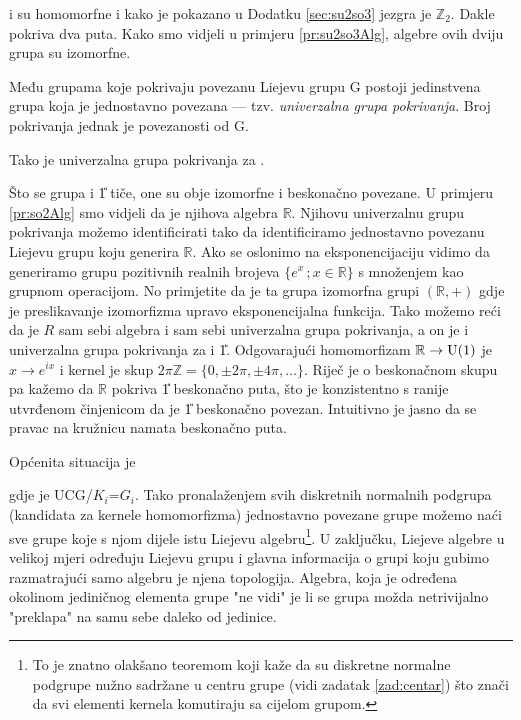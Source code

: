 \begin{primjer}[\SO{3} i \SU{2}]
 i  su homomorfne i kako je pokazano u Dodatku \ref{sec:su2so3} 
jezgra je $\mathbb{Z}_2$. Dakle  pokriva  dva puta.
Kako smo vidjeli u primjeru \ref{pr:su2so3Alg}, algebre ovih
dviju grupa su izomorfne.
\end{primjer}

\begin{teorem}
Među grupama koje pokrivaju povezanu Liejevu grupu G postoji jedinstvena
grupa koja je jednostavno povezana --- tzv. \emph{univerzalna grupa pokrivanja}.
Broj pokrivanja jednak je povezanosti od G. 
\end{teorem}


Tako je  univerzalna grupa pokrivanja za .

\centerline{}

Što se grupa  i \U{1} tiče, one su obje izomorfne i beskonačno
povezane. U primjeru \ref{pr:so2Alg} smo vidjeli da je njihova
algebra $\mathbb{R}$.
Njihovu univerzalnu grupu pokrivanja možemo identificirati
tako da identificiramo jednostavno povezanu Liejevu grupu koju
generira $\mathbb{R}$. Ako se oslonimo na eksponencijaciju
vidimo da generiramo grupu pozitivnih realnih brojeva
$\{e^{x}\,; x \in \mathbb{R}\}$ s množenjem kao grupnom operacijom.
No primjetite da je ta grupa izomorfna grupi $(\mathbb{R}, +)$
gdje je preslikavanje izomorfizma upravo eksponencijalna funkcija.
Tako možemo reći da je $R$ sam sebi algebra i sam sebi univerzalna
grupa pokrivanja, a on je i univerzalna grupa pokrivanja za
 i \U{1}. Odgovarajući homomorfizam $\mathbb{R} \to \mathrm{U}(1)$
je $x \to e^{ix}$ i kernel je skup $2\pi\mathbb{Z} = \{0, \pm 2\pi,
\pm 4\pi, \ldots\}$. Riječ je o beskonačnom skupu pa kažemo da
$\mathbb{R}$ pokriva \U{1} beskonačno puta, što je konzistentno
s ranije utvrđenom činjenicom da je \U{1} beskonačno povezan.
Intuitivno je jasno da se pravac na kružnicu namata beskonačno
puta.


Općenita situacija je\\[1ex]

\centerline{}

gdje je UCG/$K_i$=$G_i$. Tako pronalaženjem svih diskretnih normalnih
podgrupa (kandidata za kernele homomorfizma) jednostavno povezane grupe 
možemo naći sve grupe koje
s njom dijele istu Liejevu algebru\footnote{To je znatno olakšano teoremom
koji kaže da su diskretne normalne podgrupe nužno sadržane u
centru grupe (vidi zadatak \ref{zad:centar}) što znači da svi elementi
kernela komutiraju sa cijelom grupom.}.
U zaključku, Liejeve algebre u velikoj mjeri određuju Liejevu grupu i
glavna informacija o grupi koju gubimo razmatrajući samo algebru
je njena topologija. Algebra, koja je određena okolinom jediničnog
elementa grupe "ne vidi" je li se grupa možda netrivijalno "preklapa"
na samu sebe daleko od jedinice.


